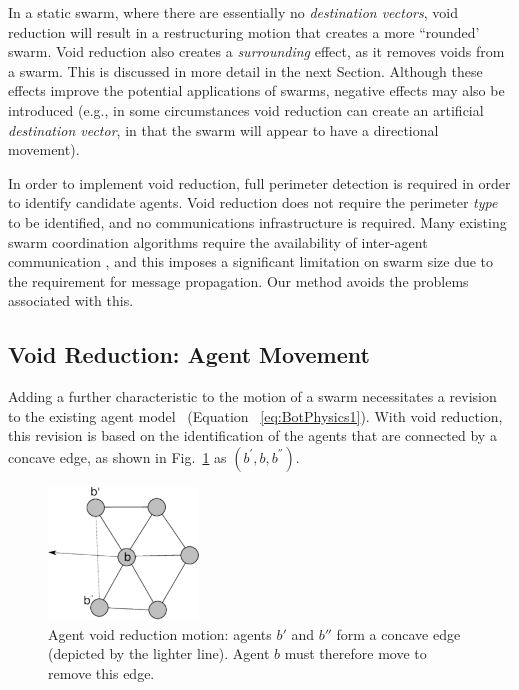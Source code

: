 \documentclass[letterpaper]{article}
\begin{document}
In a static swarm, where there are essentially no \textit{destination vectors}, void reduction will result in a restructuring motion that creates a more  ``rounded' swarm. Void reduction also creates a {\it surrounding} effect, as it removes voids from a swarm. This is discussed in more detail in the next Section.  Although these effects improve the potential applications of swarms, negative effects may also be introduced (e.g., in some circumstances void reduction can create an artificial \textit{destination vector}, in that the swarm will appear to have a directional movement). 

In order to implement void reduction, full perimeter detection is required in order to identify candidate agents. Void reduction does not require the perimeter {\it type} to be identified,  and no communications infrastructure is required. Many existing swarm coordination algorithms require the availability of inter-agent communication \cite{JG:13,MD:09,SOM:12,NIM:09,ZFG:13}, and this imposes a significant limitation on swarm size due to the requirement for message propagation. Our method avoids the problems associated with this.

\subsection{Void Reduction: Agent Movement}\label{concave:AgentMovement}

Adding a further characteristic to the motion of a swarm necessitates a revision to the existing agent model ~(Equation ~\ref{eq:BotPhysics1}). With void reduction, this revision is based on the identification of the agents that are connected by a concave edge, as shown in Fig.~\ref{concave:VoidConcave1} as $(b^{'},b,b^{''})$. 

\begin{figure}
\begin{center}
\includegraphics[width=4cm]{figures/VoidConcave1}
\end{center}
\caption{Agent void reduction motion: agents $b'$ and $b''$ form a concave edge (depicted by the lighter line). Agent $b$ must therefore move to remove this edge. \label{concave:VoidConcave1}}
\end{figure}
\end{document}
